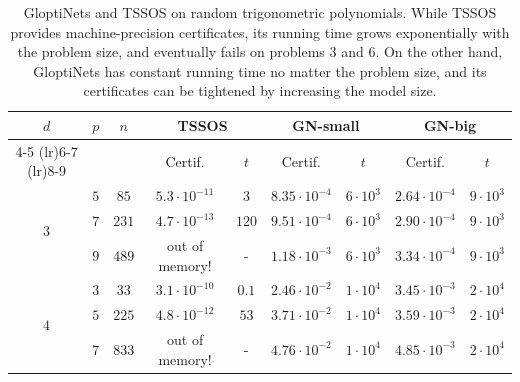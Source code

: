 \documentclass{article}
\begin{document}
\begin{table}
  \caption{GloptiNets and TSSOS on random trigonometric polynomials. While TSSOS provides machine-precision certificates, its running time grows exponentially with the problem size, and eventually fails on problems 3 and 6. On the other hand, GloptiNets has constant running time no matter the problem size, and its certificates can be tightened by increasing the model size.}
  \label{tab:xp-tsssos-fourier}
  \centering
  \begin{tabular}{*{9}{c}}
    \toprule
    \multirow{3}{*}{$d$}         &
    \multirow{3}{*}{$p$}         &
    \multirow{3}{*}{$n$}         &

    \multicolumn{2}{c}{TSSOS}    &
    \multicolumn{2}{c}{GN-small} & \multicolumn{2}{c}{GN-big}                                                                                                                            \\
    \cmidrule(lr){4-5}
    \cmidrule(lr){6-7}
    \cmidrule(lr){8-9}


                                 &                            &       & Certif.              & $t$   &
    Certif.                      & $t$                        &
    Certif.                      & $t$
    \\
    \midrule
    \multirow{3}{*}{$3$}         & $5$                        & $85$  & $5.3 \cdot 10^{-11}$ & $3$   & $8.35 \cdot 10^{-4}$ & $6 \cdot 10^{3}$ & $2.64 \cdot 10^{-4}$ & $9 \cdot 10^{3}$ \\
                                 & $7$                        & $231$ & $4.7 \cdot 10^{-13}$ & $120$ & $9.51 \cdot 10^{-4}$ & $6 \cdot 10^{3}$ & $2.90 \cdot 10^{-4}$ & $9 \cdot 10^{3}$ \\
                                 & $9$                        & $489$ & out of memory!       & -     & $1.18 \cdot 10^{-3}$ & $6 \cdot 10^{3}$ & $3.34 \cdot 10^{-4}$ & $9 \cdot 10^{3}$ \\
    \midrule
    \multirow{3}{*}{$4$}         & $3$                        & $33$  & $3.1 \cdot 10^{-10}$ & $0.1$ & $2.46 \cdot 10^{-2}$ & $1 \cdot 10^{4}$ & $3.45 \cdot 10^{-3}$ & $2 \cdot 10^{4}$ \\
                                 & $5$                        & $225$ & $4.8 \cdot 10^{-12}$ & $53$  & $3.71 \cdot 10^{-2}$ & $1 \cdot 10^{4}$ & $3.59 \cdot 10^{-3}$ & $2 \cdot 10^{4}$ \\
                                 & $7$                        & $833$ & out of memory!       & -     & $4.76 \cdot 10^{-2}$ & $1 \cdot 10^{4}$ & $4.85 \cdot 10^{-3}$ & $2 \cdot 10^{4}$ \\
    \bottomrule
  \end{tabular}
\end{table}
\end{document}
